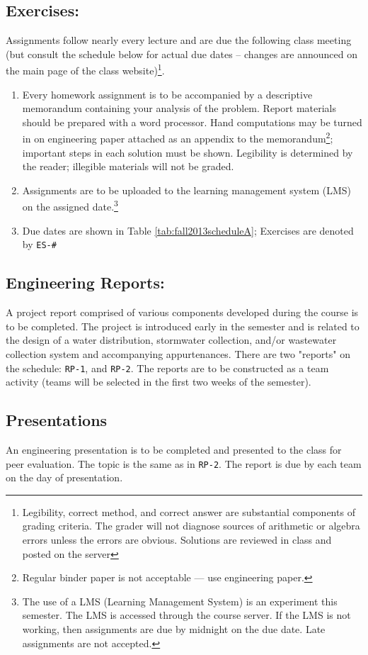 \documentclass[12pt]{article}
\begin{document}
\subsection*{Exercises:} 
Assignments follow nearly every lecture and are due the following class meeting (but consult the schedule below for actual due dates -- changes are announced on the main page of the class website)\footnote{Legibility, correct method, and correct answer are substantial components of grading criteria.   The grader will not diagnose sources of arithmetic or algebra errors unless the errors are obvious.  Solutions are reviewed in class and posted on the server}.
\begin{enumerate}
\item Every homework assignment is to be accompanied by a descriptive memorandum containing your analysis
of the problem. 
Report materials should be prepared with a word processor. 
Hand computations may be turned in on engineering paper attached as an appendix to the memorandum\footnote{Regular binder paper is not acceptable --- use engineering paper.}; important steps in each solution must be shown. 
Legibility is determined by the reader; illegible materials will not be graded.
\item Assignments are to be uploaded to the learning management system (LMS) on the assigned date.\footnote{The use of a LMS (Learning Management System) is an experiment this semester.  The LMS is accessed through the course server.  If the LMS is not working, then assignments are due by midnight on the due date. Late assignments are not accepted.}
\item Due dates are shown in Table \ref{tab:fall2013scheduleA};  Exercises are denoted by \texttt{ES-\#}
\end{enumerate}

\subsection*{Engineering Reports:}  
A project report comprised of various components developed during the course is to be completed.  
The project is introduced early in the semester and is related to the design of a water distribution, stormwater collection, and/or wastewater collection system and accompanying appurtenances.    
There are two "reports" on the schedule: \texttt{RP-1}, and \texttt{RP-2}.  
The reports are to be constructed as a team activity (teams will be selected in the first two weeks of the semester).

\subsection*{Presentations}
An engineering presentation is to be completed and presented to the class for peer evaluation. 
The topic is the same as in \texttt{RP-2}.   The report is due by each team on the day of presentation.
\end{document}
